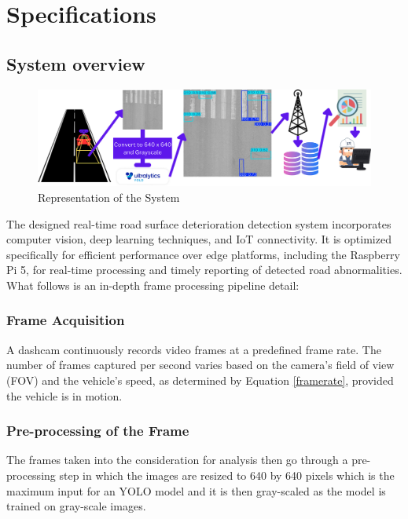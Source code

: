 \chapter{Specifications}\label{specs}

\section{System overview}
\begin{figure}[h]
    \centering
    \includegraphics[width=1\linewidth]{figures/final_system.png}
    \caption{Representation of the System}
    \label{fig:dfkdnf-label}
\end{figure}

The designed real-time road surface deterioration detection system incorporates computer vision, deep learning techniques, and IoT connectivity. It is optimized specifically for efficient performance over edge platforms, including the Raspberry Pi 5, for real-time processing and timely reporting of detected road abnormalities. What follows is an in-depth frame processing pipeline detail:

\subsection{Frame Acquisition}
A dashcam continuously records video frames at a predefined frame rate. The number of frames captured per second varies based on the camera’s field of view (FOV) and the vehicle’s speed, as determined by Equation \ref{framerate}, provided the vehicle is in motion.

\subsection{Pre-processing of the Frame}
The frames taken into the consideration for analysis then go through a pre-processing step in which the images are resized to 640 by 640 pixels which is the maximum input for an YOLO model and it is then gray-scaled as the model is trained on gray-scale images.

